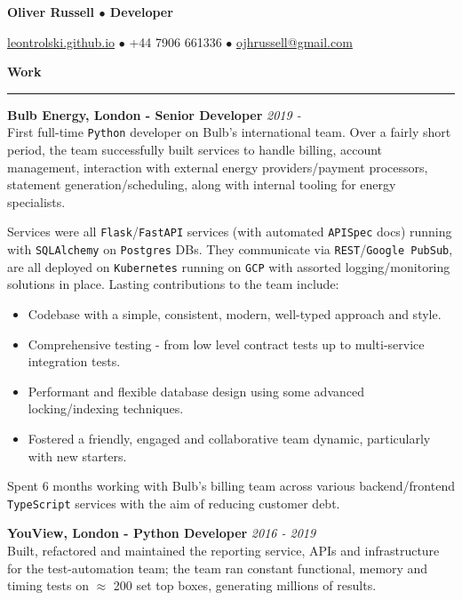 \documentclass[11pt,a4paper]{article}
\newenvironment{rSection}[1]{
  \smallskip
  {\bf #1}
  \medskip
  \hrule
  \medskip
  \begin{list}{}{
    \setlength{\leftmargin}{1.2em}
  }
  \item[]
}{
  \end{list}
}
\begin{document}
\centerline{\bf Oliver Russell $\bullet$ Developer}
\centerline{\href{https://leontrolski.github.io}{leontrolski.github.io} $\bullet$ +44 7906 661336 $\bullet$ \href{mailto:ojhrussell@gmail.com}{ojhrussell@gmail.com}}
\par
\smallskip

\begin{rSection}{Work}

{\bf Bulb Energy, London - Senior Developer} \hfill{\em 2019 -} 
\\ First full-time \texttt{Python} developer on Bulb's international team. Over a fairly short period, the team successfully built services to handle billing, account management, interaction with external energy providers/payment processors, statement generation/scheduling, along with internal tooling for energy specialists.

\par Services were all \texttt{Flask}/\texttt{FastAPI} services (with automated \texttt{APISpec} docs) running with \texttt{SQLAlchemy} on \texttt{Postgres} DBs. They communicate via \texttt{REST}/\texttt{Google PubSub}, are all deployed on \texttt{Kubernetes} running on \texttt{GCP} with assorted logging/monitoring solutions in place. Lasting contributions to the team include:
\setlength{\parskip}{0.2em}
\begin{itemize}
\item Codebase with a simple, consistent, modern, well-typed approach and style.
\item Comprehensive testing - from low level contract tests up to multi-service integration tests.
\item Performant and flexible database design using some advanced locking/indexing techniques.
\item Fostered a friendly, engaged and collaborative team dynamic, particularly with new starters.
\end{itemize}
\setlength{\parskip}{0.5em}

\par Spent 6 months working with Bulb's billing team across various backend/frontend \texttt{TypeScript} services with the aim of reducing customer debt.

\smallskip
{\bf YouView, London - Python Developer} \hfill{\em 2016 - 2019} 
\\ Built, refactored and maintained the reporting service, APIs and infrastructure for the test-automation team; the team ran constant functional, memory and timing tests on $\approx$ 200 set top boxes, generating millions of results.


\end{rSection}
\end{document}
